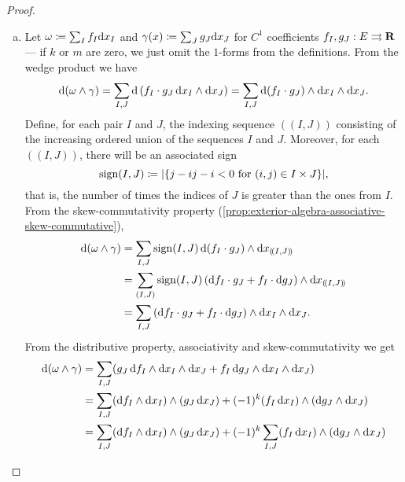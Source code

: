 \begin{proof}
\begin{enumerate}[(a)]\setlength\itemsep{0em}
\item Let \(\omega \coloneq \sum_I f_{I} \mathrm{d} x_I\) and \(\gamma(x)
  \coloneq \sum_J g_{J} \mathrm{d} x_{J}\) for \(C^1\) coefficients \(f_I, g_J: E
  \rightrightarrows \mathbf{R}\) --- if \(k\) or \(m\) are zero, we just omit the
  \(1\)-forms from the definitions. From the wedge product we have
  \[
    \mathrm{d}(\omega \wedge \gamma)
    = \sum_{I, J} \mathrm{d}\left( f_I \cdot g_J\, \mathrm{d} x_I \wedge \mathrm{d} x_J \right)
    = \sum_{I, J} \mathrm{d}(f_I \cdot g_J) \wedge \mathrm{d} x_I \wedge \mathrm{d} x_J.
  \]
  Define, for each pair \(I\) and \(J\), the indexing sequence \((\!(I, J)\!)\)
  consisting of the increasing ordered union of the sequences \(I\) and
  \(J\). Moreover, for each \((\!(I, J)\!)\), there will be an associated sign
  \begin{equation}
    \label{eq:sequence-index-sign}
    \operatorname{sign}(I, J) \coloneq |\{j - i \relax j - i < 0 \text{ for }
    (i, j) \in I \times J\}|,
  \end{equation}
  that is, the number of times the indices of \(J\) is greater than the ones
  from \(I\). From the skew-commutativity property
  (\cref{prop:exterior-algebra-associative-skew-commutative}),
  \begin{align*}
    \mathrm{d} (\omega \wedge \gamma)
    &= \sum_{I, J} \operatorname{sign}(I, J)\,
      \mathrm{d}(f_{I} \cdot g_{J}) \wedge \mathrm{d} x_{(\!(I, J)\!)} \\
    &= \sum_{(I, J)} \operatorname{sign}(I, J)
    \left( \mathrm{d} f_I \cdot g_J + f_I \cdot \mathrm{d} g_J \right)
    \wedge \mathrm{d} x_{(\!(I, J)\!)} \\
    &= \sum_{I, J} \left( \mathrm{d} f_I \cdot g_J + f_I \cdot \mathrm{d} g_J \right)
    \wedge \mathrm{d} x_I \wedge \mathrm{d} x_J.
  \end{align*}
  From the distributive property, associativity and skew-commutativity we get
  \begin{align*}
    \diff(\omega \wedge \gamma)
    &= \sum_{I, J} (g_J\, \diff f_I \wedge \diff x_I \wedge \diff x_J
    +  f_I\, \diff g_J \wedge \diff x_I \wedge \diff x_J) \\
    &= \sum_{I, J} (\diff f_I \wedge \diff x_I) \wedge (g_J\, \diff x_J)
      + (-1)^k (f_I\, \diff x_I) \wedge (\diff g_J \wedge \diff x_J) \\
    &= \sum_{I, J} (\diff f_I \wedge \diff x_I) \wedge (g_J\, \diff x_J)
      + (-1)^k \sum_{I, J} (f_I\, \diff x_I) \wedge (\diff g_J \wedge \diff x_J)
    \\

\end{align*}
\end{enumerate}
\end{proof}
